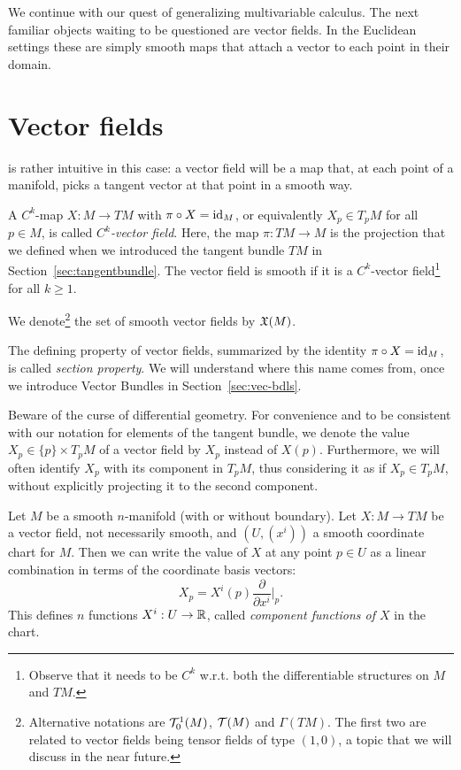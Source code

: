 We continue with our quest of generalizing multivariable calculus.
The next familiar objects waiting to be questioned are vector fields.
In the Euclidean settings these are simply smooth maps that attach a vector to each point in their domain.

\section{Vector fields}

 is rather intuitive in this case: a vector field will be a map that, at each point of a manifold, picks a tangent vector at that point in a smooth way.

\begin{definition}\label{def:vfield}
	A $C^k$-map $X: M \to TM$ with $\pi\circ X = \operatorname{id}_M$, or equivalently $X_p\in T_pM$ for all $p\in M$, is called \emph{$C^k$-vector field}. Here, the map $\pi:TM \to M$ is the projection that we defined when we introduced the tangent bundle $TM$ in Section~\ref{sec:tangentbundle}.
	The vector field is smooth if it is a $C^k$-vector field\footnote{Observe that it needs to be $C^k$ w.r.t. both the differentiable structures on $M$ and $TM$.} for all $k\geq 1$.

	We denote\footnote{Alternative notations are $\mathcal{T}_0^1(M)$, $\mathcal{T}(M)$ and $\Gamma(TM)$. The first two are related to vector fields being tensor fields of type $(1,0)$, a topic that we will discuss in the near future.} the set of smooth vector fields by $\mathfrak{X}(M)$.

	The defining property of vector fields, summarized by the identity $\pi\circ X = \operatorname{id}_M$, is   called \emph{section property}. We will understand where this name comes from, once we introduce Vector Bundles in Section~\ref{sec:vec-bdls}.
\end{definition}

Beware of the curse of differential geometry.
For convenience and to be consistent with our notation for elements of the tangent bundle, we denote the value $X_p\in\{p\}\times T_p M$ of a vector field by $X_p$ instead of $X(p)$.
Furthermore, we will often identify $X_p$ with its component in $T_pM$, thus considering it as if $X_p\in T_pM$, without explicitly projecting it to the second component.

Let $M$ be a smooth $n$-manifold (with or without boundary).
Let $X:M\to TM$ be a vector field, not necessarily smooth, and $(U, (x^i))$ a smooth coordinate chart for $M$. Then we can write the value of $X$ at any point $p\in U$ as a linear combination in terms of the coordinate basis vectors:
\begin{equation}\label{eq:vfCoordBAsis0}
	X_p = X^i(p) \frac{\partial}{\partial x^i}\Big|_p.
\end{equation}
This defines $n$ functions $X^i: U\to\mathbb{R}$, called \emph{component functions of $X$} in the chart.

